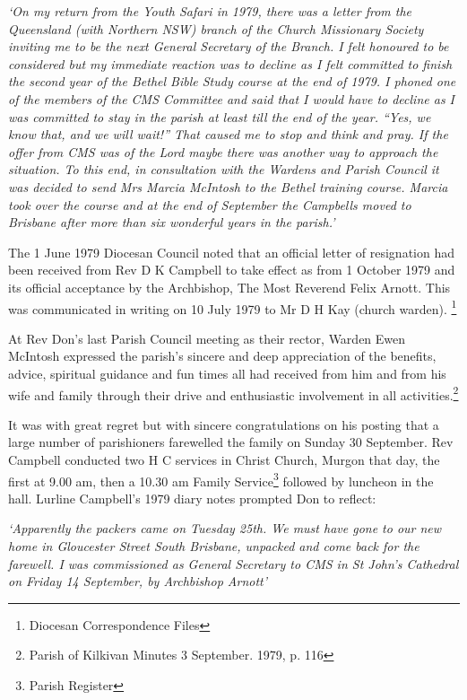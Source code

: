 \emph{`On my return from the Youth Safari in 1979, there was a letter from the Queensland (with Northern NSW) branch of the Church Missionary Society inviting me to be the next General Secretary of the Branch. I felt honoured to be considered but my immediate reaction was to decline as I felt committed to finish the second year of the Bethel Bible Study course at the end of 1979. I phoned one of the members of the CMS Committee and said that I would have to decline as I was committed to stay in the parish at least till the end of the year. ``Yes, we know that, and we will wait!'' That caused me to stop and think and pray. If the offer from CMS was of the Lord maybe there was another way to approach the situation. To this end, in consultation with the Wardens and Parish Council it was decided to send Mrs Marcia McIntosh to the Bethel training course. Marcia took over the course and at the end of September the Campbells moved to Brisbane after more than six wonderful years in the parish.'}

The 1 June 1979 Diocesan Council noted that an official letter of resignation had been received from Rev D K Campbell to take effect as from 1 October 1979 and its official acceptance by the Archbishop, The Most Reverend Felix Arnott. This was communicated in writing on 10 July 1979 to Mr D H Kay (church warden). \footnote{Diocesan Correspondence Files}

At Rev Don's last Parish Council meeting as their rector, Warden Ewen McIntosh expressed the parish's sincere and deep appreciation of the benefits, advice, spiritual guidance and fun times all had received from him and from his wife and family through their drive and enthusiastic involvement in all activities.\footnote{Parish of Kilkivan Minutes 3 September. 1979, p. 116}

It was with great regret but with sincere congratulations on his posting that a large number of parishioners farewelled the family on Sunday 30 September. Rev Campbell conducted two H C services in Christ Church, Murgon that day, the first at 9.00 am, then a 10.30 am Family Service\footnote{Parish Register} followed by luncheon in the hall. Lurline Campbell's 1979 diary notes prompted Don to reflect:

\emph{`Apparently the packers came on Tuesday 25th. We must have gone to our new home in Gloucester Street South Brisbane, unpacked and come back for the farewell. I was commissioned as General Secretary to CMS in St John's Cathedral on Friday 14 September, by Archbishop Arnott'}

